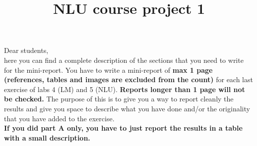 \documentclass[a4paper]{article}
\title{NLU course project 1}
\begin{document}
\maketitle

Dear students, \\
here you can find a complete description of the sections that you need to write for the mini-report. You have to write a mini-report of \textbf{max 1 page (references, tables and images are excluded from the count)} for each last exercise of labs 4 (LM) and 5 (NLU). \textbf{Reports longer than 1 page will not be checked.} The purpose of this is to give you a way to report cleanly the results and give you space to describe what you have done and/or the originality that you have added to the exercise.
\\
\textbf{If you did part A only, you have to just report the results in a table with a small description.}
\end{document}
